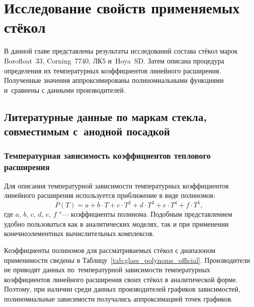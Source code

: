 \chapter{Исследование свойств применяемых стёкол}

В данной главе представлены результаты исследований состава стёкол марок
Borofloat~33, Corning~7740, ЛК5 и~Hoya~SD.
Затем описана процедура определения их температурных коэффициентов линейного
расширения. Полученные значения аппроксимированы полиномиальными функциями
и~сравнены с данными производителей.

\section{Литературные данные по маркам стекла, совместимым с~анодной посадкой} \label{GlassInfoOffic}

\subsection{Температурная зависимость коэффициентов теплового расширения}

Для описания температурной зависимости температурных коэффициентов линейного расширения используется приближение в виде полиномов:
\begin{equation*}
    P(T) = a + b \cdot T + c \cdot T^2 + d \cdot T^3 + e \cdot T^4 + f \cdot T^5,
\end{equation*}
где $a$, $b$, $c$, $d$, $e$, $f$ "--- коэффициенты полинома. Подобным представлением удобно пользоваться как в аналитических моделях, так и при применении конечноэлементных вычислительных комплексов.

Коэффициенты полиномов для рассматриваемых стёкол с диапазоном применимости сведены в Таблицу~\ref{tab:glass_polynoms_official}. Производители не приводят данных по~температурной зависимости температурных коэффициентов линейного расширения своих стёкол в аналитической форме. Поэтому, при наличии среди данных производителей графиков зависимостей, полиномиальные зависимости получались аппроксимацией точек графиков.

